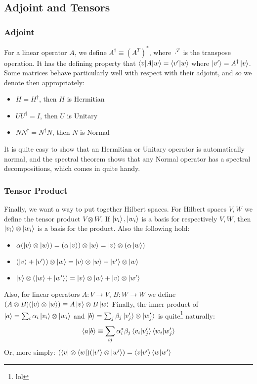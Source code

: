 \documentclass{beamer}
\begin{document}
\subsection{Adjoint and Tensors}
\begin{frame}
    \frametitle{Adjoint}
    For a linear operator $A$, we define $A^\dagger \equiv (A^T)^*$, where $\cdot^T$ is the transpose operation.
    It has the defining property that $\braket{v|A|w} = \braket{v'|w}$ where $\ket{v'} = A^\dagger \ket{v}$.
    Some matrices behave particularly well with respect with their adjoint, and so we denote then appropriately:
    \begin{itemize}
        \item $H = H^\dagger$, then $H$ is Hermitian
        \item $UU^\dagger = I$, then $U$ is Unitary
        \item $N N^\dagger = N^\dagger N$, then $N$ is Normal
    \end{itemize}
    It is quite easy to show that an Hermitian or Unitary operator is automatically normal, and
    the spectral theorem shows that any Normal operator has a spectral decompositions, which comes in quite handy.
\end{frame}
\begin{frame}
    \frametitle{Tensor Product}
    Finally, we want a way to put together Hilbert spaces. For Hilbert spaces $V, W$ we define the tensor product $V \otimes W$.
    If $\ket{v_i}, \ket{w_i}$ is a basis for respectively $V, W$, then $\ket{v_i} \otimes \ket{w_i}$ is a basis for the product.
    Also the following hold:
    \begin{itemize}
        \item $\alpha (\ket{v}\otimes\ket{w}) = (\alpha \ket{v})\otimes\ket{w} = \ket{v}\otimes (\alpha \ket{w})$
        \item $(\ket{v} + \ket{v'}) \otimes\ket{w} = \ket{v} \otimes \ket{w} + \ket{v'} \otimes \ket{w}$
        \item $\ket{v} \otimes (\ket{w} + \ket{w'}) = \ket{v} \otimes \ket{w} + \ket{v} \otimes \ket{w'}$
    \end{itemize}
    Also, for linear operators $A: V \to V$, $B: W \to W$ we define $(A \otimes B) (\ket{v} \otimes \ket{w}) \equiv A \ket{v} \otimes B \ket{w}$
    Finally, the inner product of $\ket{a} = \sum_i \alpha_i \ket{v_i} \otimes \ket{w_i}$ and $\ket{b} = \sum_j \beta_j \ket{v_j'} \otimes \ket{w_j'}$ is quite\footnote{lol} naturally:
    \begin{equation}
        \braket{a|b} \equiv \sum_{ij} \alpha_i^* \beta_j \braket{v_i|v_j'} \braket{w_i|w_j'}
    \end{equation}
    Or, more simply: $(\bra{v} \otimes \bra{w})(\ket{v'} \otimes \ket{w'}) = \braket{v|v'} \braket{w|w'}$
\end{frame}
\end{document}
